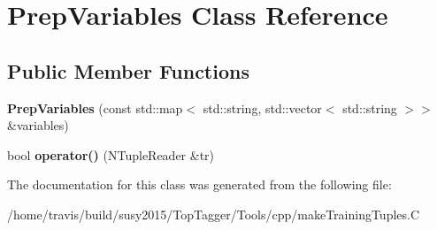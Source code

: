 \hypertarget{classPrepVariables}{\section{Prep\-Variables Class Reference}
\label{classPrepVariables}
}
\subsection*{Public Member Functions}
\begin{DoxyCompactItemize}
\item 
\hypertarget{classPrepVariables_afaef5c27456a679614be6b4eba5be2a5}{{\bfseries Prep\-Variables} (const std\-::map$<$ std\-::string, std\-::vector$<$ std\-::string $>$$>$ \&variables)}\label{classPrepVariables_afaef5c27456a679614be6b4eba5be2a5}

\item 
\hypertarget{classPrepVariables_aa9080e1aba478af9311f3017f9e987a7}{bool {\bfseries operator()} (N\-Tuple\-Reader \&tr)}\label{classPrepVariables_aa9080e1aba478af9311f3017f9e987a7}

\end{DoxyCompactItemize}


The documentation for this class was generated from the following file\-:\begin{DoxyCompactItemize}
\item 
/home/travis/build/susy2015/\-Top\-Tagger/\-Tools/cpp/make\-Training\-Tuples.\-C\end{DoxyCompactItemize}
